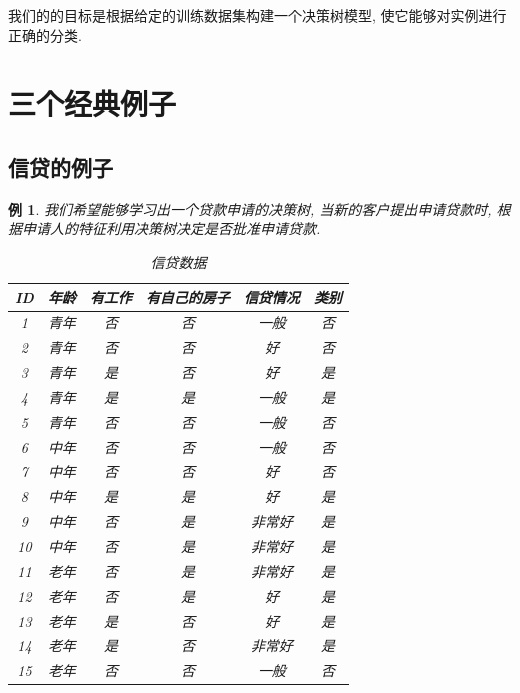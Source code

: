 \documentclass[a4paper,UTF8]{ctexart}
\theoremstyle{plain} \newtheorem{theorem}{定理}[section]
\theoremstyle{plain} \newtheorem{definition}{定义}[section]
\theoremstyle{plain} \newtheorem{lemma}{引理}[section]
\theoremstyle{plain} \newtheorem{proposition}{命题}[section]
\theoremstyle{plain} \newtheorem{example}{例}
\theoremstyle{plain} \newtheorem{remark}{注}
\theoremstyle{plain} \newtheorem{corollary}{推论}[section]
\begin{document}
我们的的目标是根据给定的训练数据集构建一个决策树模型, 使它能够对实例进行正确的分类.

\section{三个经典例子}
\subsection{信贷的例子}
\begin{example}
我们希望能够学习出一个贷款申请的决策树, 当新的客户提出申请贷款时, 根据申请人的特征利用决策树决定是否批准申请贷款.

\begin{table}[!htb]
\centering
\caption{信贷数据}
\label{xindai}
\begin{tabular}{cccccc}
  \hline
    \textbf{ID} & \textbf{年龄} & \textbf{有工作} & \textbf{有自己的房子} & \textbf{信贷情况} & \textbf{类别}\\
    \hline
    1 & 青年 & 否 & 否 &  一般  & 否 \\
    \hline
    2 & 青年 & 否 & 否 &  好  & 否 \\
    \hline
    3 & 青年 & 是 & 否 &  好  & 是 \\
    \hline
    4 & 青年 & 是 & 是 &  一般  & 是 \\
    \hline
    5 & 青年 & 否 & 否 &  一般  & 否 \\
    \hline
    6 & 中年 & 否 & 否 &  一般  & 否 \\
    \hline
    7 & 中年 & 否 & 否 &  好  & 否 \\
    \hline
    8 & 中年 & 是 & 是 &  好  & 是 \\
    \hline
    9 & 中年 & 否 & 是 &  非常好  & 是 \\
    \hline
    10 & 中年 & 否 & 是 &  非常好  & 是 \\
    \hline
    11 & 老年 & 否 & 是 &  非常好  & 是 \\
    \hline
    12 & 老年 & 否 & 是 &  好  & 是 \\
    \hline
    13 & 老年 & 是 & 否 &  好  & 是 \\
    \hline
    14 & 老年 & 是 & 否 &  非常好  & 是 \\
    \hline
    15 & 老年 & 否 & 否 &  一般  & 否 \\

  \hline
\end{tabular}
\end{table}

\end{example}
\end{document}
